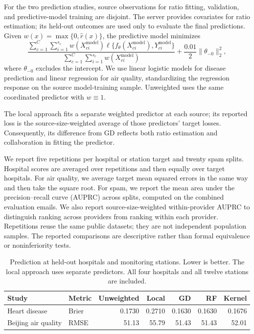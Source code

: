 For the two prediction studies, source observations for ratio fitting,
validation, and predictive-model training are disjoint. The server provides
covariates for ratio estimation; its held-out outcomes are used only to
evaluate the final predictions. Given $w(x)=\max\{0,\widehat r(x)\}$, the
predictive model minimizes
\[
 \frac{\sum_{c=1}^C\sum_{i=1}^{s_c}
       w(X_{ci}^{\mathrm{model}})
       \ell\{f_\theta(X_{ci}^{\mathrm{model}}),Y_{ci}^{\mathrm{model}}\}}
      {\sum_{c=1}^C\sum_{i=1}^{s_c}w(X_{ci}^{\mathrm{model}})}
 +\frac{0.01}{2}\|\theta_{-0}\|_2^2,
\]
where $\theta_{-0}$ excludes the intercept. We use linear logistic models for
disease prediction and linear regression for air quality, standardizing the
regression response on the source model-training sample. Unweighted uses
the same coordinated predictor with $w\equiv1$.

The local approach fits a separate weighted predictor at each source; its
reported loss is the source-size-weighted average of those predictors' target
losses. Consequently, its difference from GD reflects both ratio estimation
and collaboration in fitting the predictor.

We report five repetitions per hospital or station target and twenty spam
splits. Hospital scores are averaged over repetitions and then equally over
target hospitals. For air quality, we average target mean squared errors in
the same way and then take the square root. For spam, we report the mean area
under the precision--recall curve (AUPRC) across splits, computed on the combined
evaluation emails. We also report source-size-weighted within-provider AUPRC
to distinguish ranking across providers from ranking within each provider.
Repetitions reuse the same public datasets; they are not independent population
samples. The reported comparisons are descriptive rather than formal
equivalence or noninferiority tests.

\begin{table}[htbp]
\centering
\caption{Prediction at held-out hospitals and monitoring stations. Lower is
better. The local approach uses separate predictors. All four hospitals and
all twelve stations are included.}
\label{tab:applications-natural}
\medskip
\small
\setlength{\tabcolsep}{4pt}
\begin{tabular}{llrrrrr}
\toprule
Study & Metric & Unweighted & Local & GD & RF & Kernel \\
\midrule
Heart disease & Brier & 0.1730 & 0.2710 & 0.1630 & 0.1630 & 0.1676 \\
Beijing air quality & RMSE & 51.13 & 55.79 & 51.43 & 51.43 & 52.01 \\
\bottomrule
\end{tabular}
\end{table}

